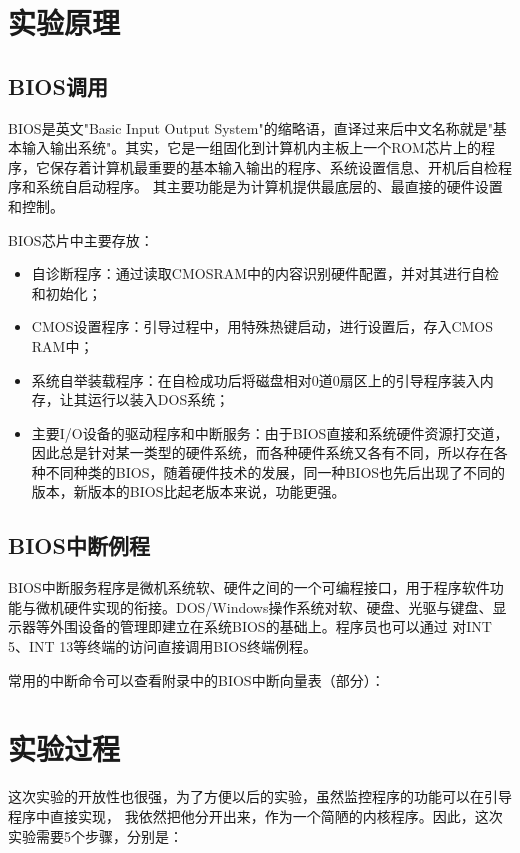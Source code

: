 \documentclass[a4paper, 11pt]{article} %
\begin{document}
\section{实验原理}
\subsection{BIOS调用}
BIOS是英文"Basic Input Output System"的缩略语，直译过来后中文名称就是"基本输入输出系统"。其实，它是一组固化到计算机内主板上一个ROM芯片上的程序，它保存着计算机最重要的基本输入输出的程序、系统设置信息、开机后自检程序和系统自启动程序。 其主要功能是为计算机提供最底层的、最直接的硬件设置和控制。

BIOS芯片中主要存放：

\begin{itemize}
  \item 自诊断程序：通过读取CMOSRAM中的内容识别硬件配置，并对其进行自检和初始化；
  \item CMOS设置程序：引导过程中，用特殊热键启动，进行设置后，存入CMOS RAM中；
  \item 系统自举装载程序：在自检成功后将磁盘相对0道0扇区上的引导程序装入内存，让其运行以装入DOS系统；
  \item 主要I/O设备的驱动程序和中断服务：由于BIOS直接和系统硬件资源打交道，因此总是针对某一类型的硬件系统，而各种硬件系统又各有不同，所以存在各种不同种类的BIOS，随着硬件技术的发展，同一种BIOS也先后出现了不同的版本，新版本的BIOS比起老版本来说，功能更强。
\end{itemize}

\subsection{BIOS中断例程}
BIOS中断服务程序是微机系统软、硬件之间的一个可编程接口，用于程序软件功能与微机硬件实现的衔接。DOS/Windows操作系统对软、硬盘、光驱与键盘、显示器等外围设备的管理即建立在系统BIOS的基础上。程序员也可以通过 对INT 5、INT 13等终端的访问直接调用BIOS终端例程。

常用的中断命令可以查看附录中的BIOS中断向量表（部分）：\cite{wikiBIOS}

\section{实验过程}

这次实验的开放性也很强，为了方便以后的实验，虽然监控程序的功能可以在引导程序中直接实现，
我依然把他分开出来，作为一个简陋的内核程序。因此，这次实验需要5个步骤，分别是：
\end{document}
